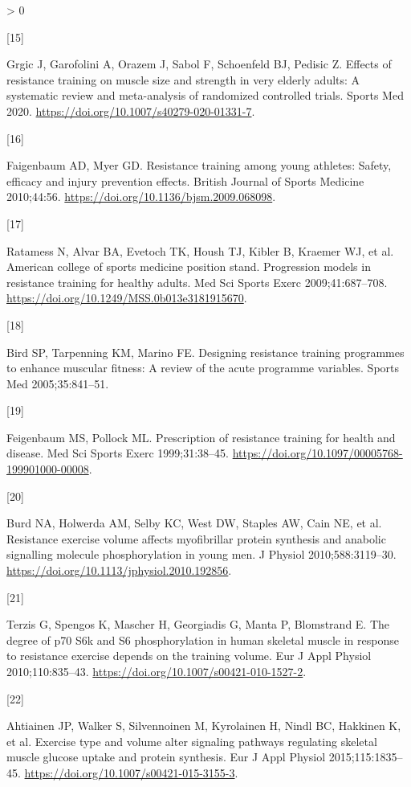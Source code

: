 \documentclass[twoside,10pt]{gihclass} %
\newlength{\cslhangindent}
\newlength{\csllabelwidth}
\newenvironment{CSLReferences}[3] %
 {%
  \setlength{\parindent}{0pt}
  \ifodd #1 \everypar{\setlength{\hangindent}{\cslhangindent}}\ignorespaces\fi
  \ifnum #2 > 0
  \setlength{\parskip}{#2\baselineskip}
  \fi
 }%
 {}
\newcommand{\CSLLeftMargin}[1]{\parbox[t]{\maxof{\widthof{#1}}{\csllabelwidth}}{#1}}
\newcommand{\CSLRightInline}[1]{\parbox[t]{\linewidth}{#1}}
\begin{document}
\begin{CSLReferences}{0}{0}
\leavevmode\hypertarget{ref-RN2534}{}%
\CSLLeftMargin{{[}15{]} }
\CSLRightInline{Grgic J, Garofolini A, Orazem J, Sabol F, Schoenfeld BJ, Pedisic Z. Effects of resistance training on muscle size and strength in very elderly adults: A systematic review and meta-analysis of randomized controlled trials. Sports Med 2020. \url{https://doi.org/10.1007/s40279-020-01331-7}.}

\leavevmode\hypertarget{ref-RN2536}{}%
\CSLLeftMargin{{[}16{]} }
\CSLRightInline{Faigenbaum AD, Myer GD. Resistance training among young athletes: Safety, efficacy and injury prevention effects. British Journal of Sports Medicine 2010;44:56. \url{https://doi.org/10.1136/bjsm.2009.068098}.}

\leavevmode\hypertarget{ref-RN1}{}%
\CSLLeftMargin{{[}17{]} }
\CSLRightInline{Ratamess N, Alvar BA, Evetoch TK, Housh TJ, Kibler B, Kraemer WJ, et al. American college of sports medicine position stand. Progression models in resistance training for healthy adults. Med Sci Sports Exerc 2009;41:687--708. \url{https://doi.org/10.1249/MSS.0b013e3181915670}.}

\leavevmode\hypertarget{ref-RN798}{}%
\CSLLeftMargin{{[}18{]} }
\CSLRightInline{Bird SP, Tarpenning KM, Marino FE. Designing resistance training programmes to enhance muscular fitness: A review of the acute programme variables. Sports Med 2005;35:841--51.}

\leavevmode\hypertarget{ref-RN2538}{}%
\CSLLeftMargin{{[}19{]} }
\CSLRightInline{Feigenbaum MS, Pollock ML. Prescription of resistance training for health and disease. Med Sci Sports Exerc 1999;31:38--45. \url{https://doi.org/10.1097/00005768-199901000-00008}.}

\leavevmode\hypertarget{ref-RN791}{}%
\CSLLeftMargin{{[}20{]} }
\CSLRightInline{Burd NA, Holwerda AM, Selby KC, West DW, Staples AW, Cain NE, et al. Resistance exercise volume affects myofibrillar protein synthesis and anabolic signalling molecule phosphorylation in young men. J Physiol 2010;588:3119--30. \url{https://doi.org/10.1113/jphysiol.2010.192856}.}

\leavevmode\hypertarget{ref-RN784}{}%
\CSLLeftMargin{{[}21{]} }
\CSLRightInline{Terzis G, Spengos K, Mascher H, Georgiadis G, Manta P, Blomstrand E. The degree of p70 S6k and S6 phosphorylation in human skeletal muscle in response to resistance exercise depends on the training volume. Eur J Appl Physiol 2010;110:835--43. \url{https://doi.org/10.1007/s00421-010-1527-2}.}

\leavevmode\hypertarget{ref-RN1837}{}%
\CSLLeftMargin{{[}22{]} }
\CSLRightInline{Ahtiainen JP, Walker S, Silvennoinen M, Kyrolainen H, Nindl BC, Hakkinen K, et al. Exercise type and volume alter signaling pathways regulating skeletal muscle glucose uptake and protein synthesis. Eur J Appl Physiol 2015;115:1835--45. \url{https://doi.org/10.1007/s00421-015-3155-3}.}


\end{CSLReferences}
\end{document}
